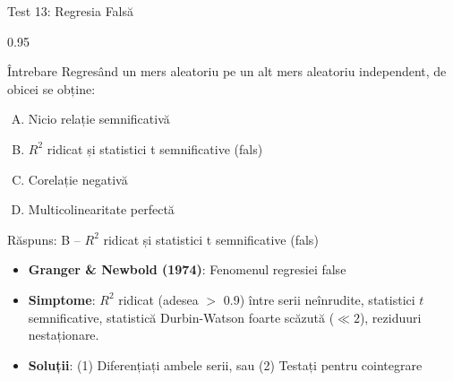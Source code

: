 \documentclass[9pt, aspectratio=169, t]{beamer}
\begin{document}
\begin{frame}{Test 13: Regresia Falsă}
    \begin{cminipage}{0.95\textwidth}
    \begin{alertblock}{Întrebare}
        Regresând un mers aleatoriu pe un alt mers aleatoriu independent, de obicei se obține:
    \end{alertblock}

    \vspace{0.2cm}

    \begin{enumerate}[A)]\setlength{\itemsep}{0pt}
        \item Nicio relație semnificativă
        \item $R^2$ ridicat și statistici t semnificative (fals)
        \item Corelație negativă
        \item Multicolinearitate perfectă
    \end{enumerate}

    \vspace{0.3cm}
    \pause
    \begin{exampleblock}{Răspuns: B -- $R^2$ ridicat și statistici t semnificative (fals)}
        \begin{itemize}\setlength{\itemsep}{0pt}
        \item \textbf{Granger \& Newbold (1974)}: Fenomenul regresiei false
        \item \textbf{Simptome}: $R^2$ ridicat (adesea $>$ 0.9) între serii neînrudite, statistici $t$ semnificative, statistică Durbin-Watson foarte scăzută ($\ll 2$), reziduuri nestaționare.
        \item \textbf{Soluții}: (1) Diferențiați ambele serii, sau (2) Testați pentru cointegrare
        \end{itemize}
    \end{exampleblock}
    \end{cminipage}
\end{frame}
\end{document}
